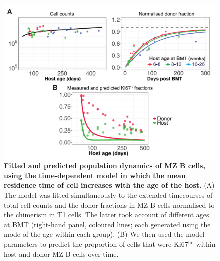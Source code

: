 \documentclass[11pt]{article}
\newcommand{\khi}{Ki67$^\text{hi}$}
\begin{document}
\begin{figure}[h!]
	\centerline{\includegraphics[scale = 0.85] {TDM_MZ.pdf}}
	\caption{\small \textbf{Fitted and predicted population dynamics of MZ B cells, using the time-dependent model in which the mean residence time of cell increases with the age of the host.}  (A) The model was fitted simultaneously to the extended timecourses of total cell counts and the donor fractions in MZ B cells normalised to the chimerism in T1 cells. The latter took account of different ages at BMT (right-hand panel, coloured lines; each generated using the  mode of the age within each group). (B) We then used the model parameters to predict the proportion of cells that were \khi\ within host and donor MZ B cells over time.}
	\label{fig:TDM_MZ}
\end{figure}
\end{document}
